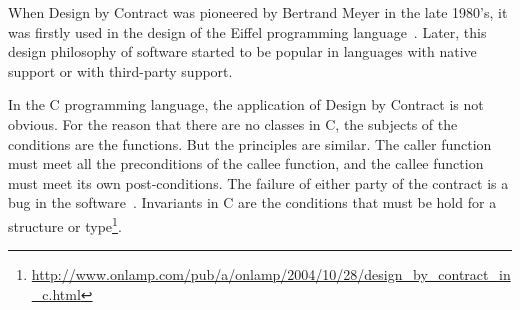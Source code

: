 When Design by Contract was pioneered by Bertrand Meyer in the late 1980's, it was firstly used in the design of the Eiffel programming language~\cite{ii}. Later, this design philosophy of software started to be popular in languages with native support or with third-party support. 

%
%

In the C programming language, the application of Design by Contract is not obvious. %
For the reason that there are no classes in C, the subjects of the conditions are the functions. But the principles are similar. The caller function must meet all the preconditions of the callee function, and the callee function must meet its own post-conditions. The failure of either party of the contract is a bug in the software~\cite{jj}. Invariants in C are the conditions that must be hold for a structure or type\footnote{\url{http://www.onlamp.com/pub/a/onlamp/2004/10/28/design_by_contract_in_c.html}}. 


